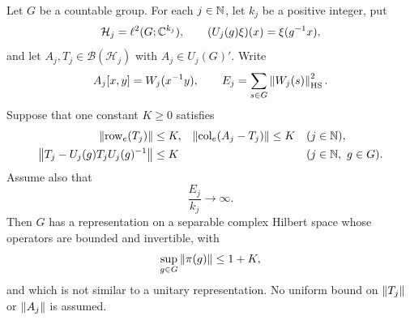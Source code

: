 \begin{proposition}
\label{prop:direct-sum-obstruction}
Let $G$ be a countable group.
For each $j\in\mathbb N$, let $k_j$ be a positive integer, put
\[
  \mathcal H_j=\ell^2(G;\mathbb C^{k_j}),
  \qquad (U_j(g)\xi)(x)=\xi(g^{-1}x),
\]
and let $A_j,T_j\in\mathcal B(\mathcal H_j)$ with
$A_j\in U_j(G)'$.
Write
\[
  A_j[x,y]=W_j(x^{-1}y),\qquad
  E_j=\sum_{s\in G}\left\lVert W_j(s)\right\rVert_{\mathrm{HS}}^2.
\]
Suppose that one constant $K\ge0$ satisfies
\begin{align*}
  \left\lVert\operatorname{row}_e(T_j)\right\rVert&\le K, &
  \left\lVert\operatorname{col}_e(A_j-T_j)\right\rVert&\le K
  &&(j\in\mathbb N),\\
  \left\lVert T_j-U_j(g)T_jU_j(g)^{-1}\right\rVert&\le K
  &&&&(j\in\mathbb N,\ g\in G).
\end{align*}
Assume also that
\[
  \frac{E_j}{k_j}\longrightarrow\infty.
\]
Then $G$ has a representation on a separable complex Hilbert space
whose operators are bounded and invertible, with
\[
  \sup_{g\in G}\left\lVert\pi(g)\right\rVert\le1+K,
\]
and which is not similar to a unitary representation.
No uniform bound on $\left\lVert T_j\right\rVert$ or $\left\lVert A_j\right\rVert$ is assumed.
\end{proposition}

